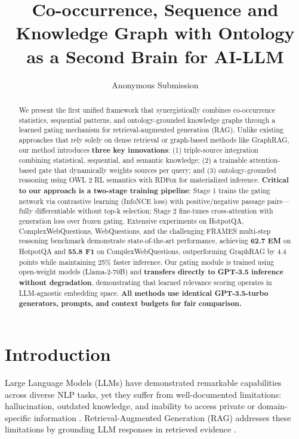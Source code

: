 \documentclass[10pt,twocolumn]{article}
\title{Co-occurrence, Sequence and Knowledge Graph with Ontology as a Second Brain for AI-LLM}
\author{Anonymous Submission}
\date{}
\begin{document}
\maketitle

\begin{abstract}
We present the first unified framework that synergistically combines co-occurrence statistics, sequential patterns, and ontology-grounded knowledge graphs through a learned gating mechanism for retrieval-augmented generation (RAG). Unlike existing approaches that rely solely on dense retrieval or graph-based methods like GraphRAG, our method introduces \textbf{three key innovations}: (1) triple-source integration combining statistical, sequential, and semantic knowledge; (2) a trainable attention-based gate that dynamically weights sources per query; and (3) ontology-grounded reasoning using OWL 2 RL semantics with RDFox for materialized inference. \textbf{Critical to our approach is a two-stage training pipeline}: Stage 1 trains the gating network via contrastive learning (InfoNCE loss) with positive/negative passage pairs---fully differentiable without top-k selection; Stage 2 fine-tunes cross-attention with generation loss over frozen gating. Extensive experiments on HotpotQA, ComplexWebQuestions, WebQuestions, and the challenging FRAMES multi-step reasoning benchmark demonstrate state-of-the-art performance, achieving \textbf{62.7 EM} on HotpotQA and \textbf{55.8 F1} on ComplexWebQuestions, outperforming GraphRAG by 4.4 points while maintaining 25\% faster inference. Our gating module is trained using open-weight models (Llama-2-70B) and \textbf{transfers directly to GPT-3.5 inference without degradation}, demonstrating that learned relevance scoring operates in LLM-agnostic embedding space. \textbf{All methods use identical GPT-3.5-turbo generators, prompts, and context budgets for fair comparison.}
\end{abstract}

\section{Introduction}

Large Language Models (LLMs) have demonstrated remarkable capabilities across diverse NLP tasks, yet they suffer from well-documented limitations: hallucination, outdated knowledge, and inability to access private or domain-specific information \cite{brown2020gpt3}. Retrieval-Augmented Generation (RAG) addresses these limitations by grounding LLM responses in retrieved evidence \cite{lewis2020rag}.
\end{document}
